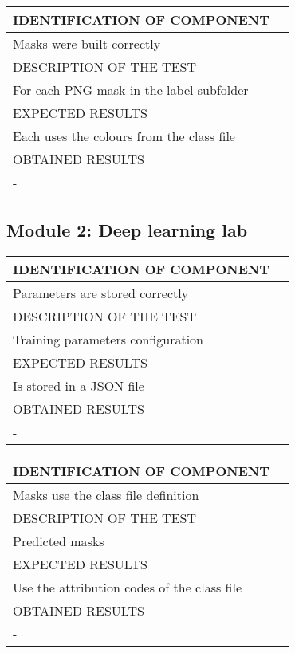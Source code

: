 \documentclass{polytech/polytech}
\numberwithin{figure}{chapter}
\begin{document}
\begin{appendix}
\begin{table}[]
\begin{tabular}{|l|l|}\hline
\color{C} IDENTIFICATION OF COMPONENT \\\hline
Masks were built correctly  \\\hline
\color{C} DESCRIPTION OF THE TEST\\\hline
For each PNG mask in the label subfolder  \\\hline
\color{C} EXPECTED RESULTS \\\hline
Each uses the colours from the class file \\\hline
\color{C} OBTAINED RESULTS \\\hline
- \\\hline
\end{tabular}
\end{table}

\subsection{Module 2: Deep learning lab}

\begin{table}[]
\begin{tabular}{|l|l|}\hline
\color{C} IDENTIFICATION OF COMPONENT \\\hline
Parameters are stored correctly  \\\hline
\color{C} DESCRIPTION OF THE TEST\\\hline
Training parameters configuration  \\\hline
\color{C} EXPECTED RESULTS \\\hline
Is stored in a JSON file \\\hline
\color{C} OBTAINED RESULTS \\\hline
- \\\hline
\end{tabular}
\end{table}

\begin{table}[]
\begin{tabular}{|l|l|}\hline
\color{C} IDENTIFICATION OF COMPONENT \\\hline
Masks use the class file definition  \\\hline
\color{C} DESCRIPTION OF THE TEST\\\hline
Predicted masks   \\\hline
\color{C} EXPECTED RESULTS \\\hline
Use the attribution codes of the class file \\\hline
\color{C} OBTAINED RESULTS \\\hline
- \\\hline
\end{tabular}
\end{table}


\end{appendix}
\end{document}
